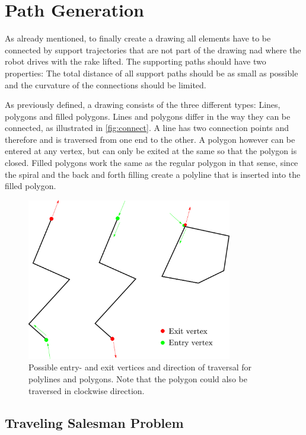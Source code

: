 \section{Path Generation}
As already mentioned, to finally create a drawing all elements have to be connected by support trajectories that are not part of the drawing nad where the robot drives with the rake lifted. The supporting paths should have two properties: The total distance of all support paths should be as small as possible and the curvature of the connections should be limited.

As previously defined, a drawing consists of the three different types: Lines, polygons and filled polygons. Lines and polygons differ in the way they can be connected, as illustrated in \autoref{fig:connect}. A line has two connection points and therefore and is traversed from one end to the other. A polygon however can be entered at any vertex, but can only be exited at the same so that the polygon is closed. Filled polygons work the same as the regular polygon in that sense, since the spiral and the back and forth filling create a polyline that is inserted into the filled polygon.

\begin{figure}
\includegraphics[width=0.8\textwidth]{images/path_planning/traversal.pdf}
\caption{Possible entry- and exit vertices and direction of traversal for polylines and polygons. Note that the polygon could also be traversed in clockwise direction.}
\end{figure}

\subsection{Traveling Salesman Problem}

